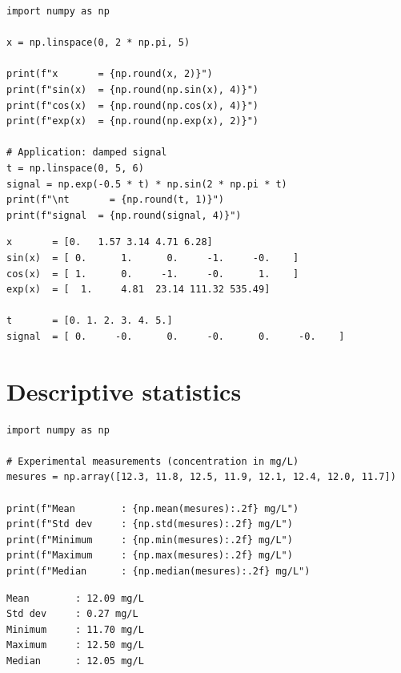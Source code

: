\begin{codeblock}[title=\textbf{Python}]
\begin{verbatim}
import numpy as np

x = np.linspace(0, 2 * np.pi, 5)

print(f"x       = {np.round(x, 2)}")
print(f"sin(x)  = {np.round(np.sin(x), 4)}")
print(f"cos(x)  = {np.round(np.cos(x), 4)}")
print(f"exp(x)  = {np.round(np.exp(x), 2)}")

# Application: damped signal
t = np.linspace(0, 5, 6)
signal = np.exp(-0.5 * t) * np.sin(2 * np.pi * t)
print(f"\nt       = {np.round(t, 1)}")
print(f"signal  = {np.round(signal, 4)}")
\end{verbatim}
\end{codeblock}

\begin{codeoutput}
\begin{verbatim}
x       = [0.   1.57 3.14 4.71 6.28]
sin(x)  = [ 0.      1.      0.     -1.     -0.    ]
cos(x)  = [ 1.      0.     -1.     -0.      1.    ]
exp(x)  = [  1.     4.81  23.14 111.32 535.49]

t       = [0. 1. 2. 3. 4. 5.]
signal  = [ 0.     -0.      0.     -0.      0.     -0.    ]
\end{verbatim}
\end{codeoutput}

\section{Descriptive statistics}

\begin{codeblock}[title=\textbf{Python}]
\begin{verbatim}
import numpy as np

# Experimental measurements (concentration in mg/L)
mesures = np.array([12.3, 11.8, 12.5, 11.9, 12.1, 12.4, 12.0, 11.7])

print(f"Mean        : {np.mean(mesures):.2f} mg/L")
print(f"Std dev     : {np.std(mesures):.2f} mg/L")
print(f"Minimum     : {np.min(mesures):.2f} mg/L")
print(f"Maximum     : {np.max(mesures):.2f} mg/L")
print(f"Median      : {np.median(mesures):.2f} mg/L")
\end{verbatim}
\end{codeblock}

\begin{codeoutput}
\begin{verbatim}
Mean        : 12.09 mg/L
Std dev     : 0.27 mg/L
Minimum     : 11.70 mg/L
Maximum     : 12.50 mg/L
Median      : 12.05 mg/L
\end{verbatim}
\end{codeoutput}

